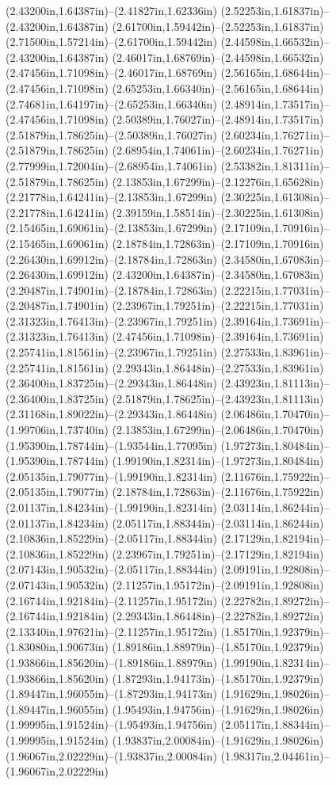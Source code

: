 (2.43200in,1.64387in)--(2.41827in,1.62336in) (2.52253in,1.61837in)--(2.43200in,1.64387in) (2.61700in,1.59442in)--(2.52253in,1.61837in) (2.71500in,1.57214in)--(2.61700in,1.59442in) (2.44598in,1.66532in)--(2.43200in,1.64387in) (2.46017in,1.68769in)--(2.44598in,1.66532in) (2.47456in,1.71098in)--(2.46017in,1.68769in) (2.56165in,1.68644in)--(2.47456in,1.71098in) (2.65253in,1.66340in)--(2.56165in,1.68644in) (2.74681in,1.64197in)--(2.65253in,1.66340in) (2.48914in,1.73517in)--(2.47456in,1.71098in) (2.50389in,1.76027in)--(2.48914in,1.73517in) (2.51879in,1.78625in)--(2.50389in,1.76027in) (2.60234in,1.76271in)--(2.51879in,1.78625in) (2.68954in,1.74061in)--(2.60234in,1.76271in) (2.77999in,1.72004in)--(2.68954in,1.74061in) (2.53382in,1.81311in)--(2.51879in,1.78625in) (2.13853in,1.67299in)--(2.12276in,1.65628in) (2.21778in,1.64241in)--(2.13853in,1.67299in) (2.30225in,1.61308in)--(2.21778in,1.64241in) (2.39159in,1.58514in)--(2.30225in,1.61308in) (2.15465in,1.69061in)--(2.13853in,1.67299in) (2.17109in,1.70916in)--(2.15465in,1.69061in) (2.18784in,1.72863in)--(2.17109in,1.70916in) (2.26430in,1.69912in)--(2.18784in,1.72863in) (2.34580in,1.67083in)--(2.26430in,1.69912in) (2.43200in,1.64387in)--(2.34580in,1.67083in) (2.20487in,1.74901in)--(2.18784in,1.72863in) (2.22215in,1.77031in)--(2.20487in,1.74901in) (2.23967in,1.79251in)--(2.22215in,1.77031in) (2.31323in,1.76413in)--(2.23967in,1.79251in) (2.39164in,1.73691in)--(2.31323in,1.76413in) (2.47456in,1.71098in)--(2.39164in,1.73691in) (2.25741in,1.81561in)--(2.23967in,1.79251in) (2.27533in,1.83961in)--(2.25741in,1.81561in) (2.29343in,1.86448in)--(2.27533in,1.83961in) (2.36400in,1.83725in)--(2.29343in,1.86448in) (2.43923in,1.81113in)--(2.36400in,1.83725in) (2.51879in,1.78625in)--(2.43923in,1.81113in) (2.31168in,1.89022in)--(2.29343in,1.86448in) (2.06486in,1.70470in)--(1.99706in,1.73740in) (2.13853in,1.67299in)--(2.06486in,1.70470in) (1.95390in,1.78744in)--(1.93544in,1.77095in) (1.97273in,1.80484in)--(1.95390in,1.78744in) (1.99190in,1.82314in)--(1.97273in,1.80484in) (2.05135in,1.79077in)--(1.99190in,1.82314in) (2.11676in,1.75922in)--(2.05135in,1.79077in) (2.18784in,1.72863in)--(2.11676in,1.75922in) (2.01137in,1.84234in)--(1.99190in,1.82314in) (2.03114in,1.86244in)--(2.01137in,1.84234in) (2.05117in,1.88344in)--(2.03114in,1.86244in) (2.10836in,1.85229in)--(2.05117in,1.88344in) (2.17129in,1.82194in)--(2.10836in,1.85229in) (2.23967in,1.79251in)--(2.17129in,1.82194in) (2.07143in,1.90532in)--(2.05117in,1.88344in) (2.09191in,1.92808in)--(2.07143in,1.90532in) (2.11257in,1.95172in)--(2.09191in,1.92808in) (2.16744in,1.92184in)--(2.11257in,1.95172in) (2.22782in,1.89272in)--(2.16744in,1.92184in) (2.29343in,1.86448in)--(2.22782in,1.89272in) (2.13340in,1.97621in)--(2.11257in,1.95172in) (1.85170in,1.92379in)--(1.83080in,1.90673in) (1.89186in,1.88979in)--(1.85170in,1.92379in) (1.93866in,1.85620in)--(1.89186in,1.88979in) (1.99190in,1.82314in)--(1.93866in,1.85620in) (1.87293in,1.94173in)--(1.85170in,1.92379in) (1.89447in,1.96055in)--(1.87293in,1.94173in) (1.91629in,1.98026in)--(1.89447in,1.96055in) (1.95493in,1.94756in)--(1.91629in,1.98026in) (1.99995in,1.91524in)--(1.95493in,1.94756in) (2.05117in,1.88344in)--(1.99995in,1.91524in) (1.93837in,2.00084in)--(1.91629in,1.98026in) (1.96067in,2.02229in)--(1.93837in,2.00084in) (1.98317in,2.04461in)--(1.96067in,2.02229in) 